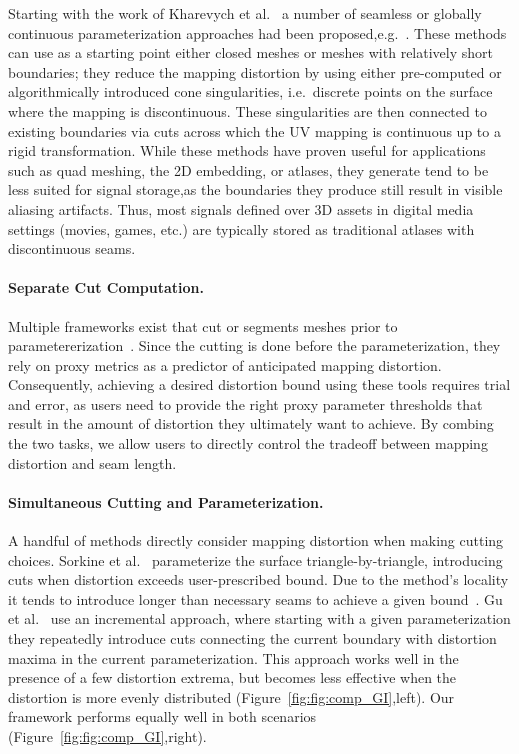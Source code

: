 Starting with the work of Kharevych et al.~ a number of seamless or globally continuous parameterization approaches had been proposed,e.g.~\cite{Ray,Myles,Aigerman}. These methods can use as a starting point either closed meshes or meshes with relatively short boundaries; they reduce the mapping distortion by using either pre-computed or algorithmically introduced cone singularities, i.e.\ discrete points on the surface where the mapping is discontinuous. These singularities are then connected to existing boundaries via cuts across which the UV mapping is continuous up to a rigid transformation.  While these methods have proven useful for applications such as quad meshing, the 2D embedding, or atlases, they generate tend to be less suited for signal storage,as the boundaries they produce still result in visible aliasing artifacts. Thus, most signals defined over 3D assets in digital media settings (movies, games, etc.) are typically stored as traditional atlases with discontinuous seams.  

\paragraph{Separate Cut Computation.}
Multiple frameworks exist that cut or segments meshes prior to parametererization~\cite{Sheffer2002Seamster,Julius2005D,Snyder2003Multi,Levy2002,needMore}.
Since the cutting is done before the parameterization, they rely on proxy metrics as a predictor of anticipated mapping distortion. Consequently, achieving a desired distortion bound using these tools requires trial and error, as users need to provide the right proxy parameter thresholds that result in the amount of distortion they ultimately want to achieve. By combing the two tasks, we allow users to directly control the tradeoff between mapping distortion and seam length. 

\paragraph{Simultaneous Cutting and Parameterization.}
A handful of methods directly consider mapping distortion when making cutting choices. 
Sorkine et al.~ parameterize the surface triangle-by-triangle, introducing cuts when distortion exceeds user-prescribed bound. Due to the method's locality it tends to introduce longer than necessary seams to achieve a given bound~\cite{Hormann2008,Poranne2017Autocuts}. 
Gu et al.~ use an incremental approach, where starting with a given parameterization they  repeatedly introduce cuts connecting the current boundary with distortion maxima in the current parameterization.  This approach works well in the presence of a few distortion extrema, but becomes less effective when the distortion is more evenly distributed (Figure~\ref{fig:fig:comp_GI},left). Our framework performs equally well in both scenarios (Figure~\ref{fig:fig:comp_GI},right).  

